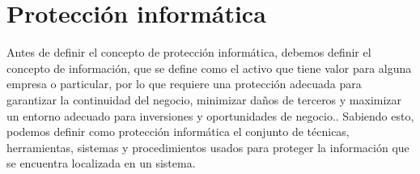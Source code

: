 \chapter{Protección informática}
\label{cha:proteccion-informatica}
Antes de definir el concepto de protección informática, debemos definir el concepto de información, que se define como el activo que tiene valor para alguna empresa o particular, por lo que requiere una protección adecuada para garantizar la continuidad del negocio, minimizar daños de terceros y maximizar un entorno adecuado para inversiones y oportunidades de negocio.\cite{info}. Sabiendo esto, podemos definir como protección informática el conjunto de técnicas, herramientas, sistemas y procedimientos usados para proteger la información que se encuentra localizada en un sistema.\cite{proteccion} 
